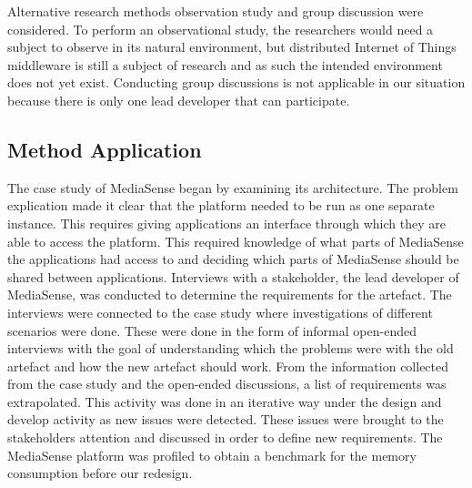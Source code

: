 Alternative research methods observation study and group discussion were considered. To perform an observational study, the researchers would need a subject to observe in its natural environment, but distributed Internet of Things middleware is still a subject of research and as such the intended environment does not yet exist. Conducting group discussions is not applicable in our situation because there is only one lead developer that can participate. 

%

\subsection{Method Application}
The case study of MediaSense began by examining its architecture. The problem explication made it clear that the platform needed to be run as one separate instance. This requires giving applications an interface through which they are able to access the platform. This required knowledge of what parts of MediaSense the applications had access to and deciding which parts of MediaSense should be shared between applications. Interviews with a stakeholder, the lead developer of MediaSense, was conducted to determine the requirements for the artefact. The interviews were connected to the case study where investigations of different scenarios were done. These were done in the form of informal open-ended interviews with the goal of understanding which the problems were with the old artefact and how the new artefact should work.
From the information collected from the case study and the open-ended discussions, a list of requirements was extrapolated. This activity was done in an iterative way under the design and develop activity as new issues were detected. These issues were brought to the stakeholders attention and discussed in order to define new requirements. The MediaSense platform was profiled to obtain a benchmark for the memory consumption before our redesign.
